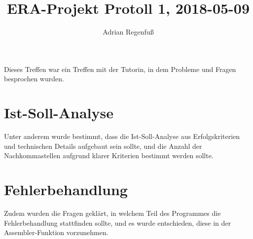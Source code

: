 \documentclass{article}
\title{ERA-Projekt Protoll 1, 2018-05-09}
\author{Adrian Regenfuß}
\begin{document}
\maketitle

Dieses Treffen war ein Treffen mit der Tutorin, in dem Probleme und
Fragen besprochen wurden.

\section{Ist-Soll-Analyse}

Unter anderem wurde bestimmt, dass die Ist-Soll-Analyse aus
Erfolgskriterien und technischen Details aufgebaut sein sollte, und
die Anzahl der Nachkommastellen aufgrund klarer Kriterien bestimmt
werden sollte.

\section{Fehlerbehandlung}

Zudem wurden die Fragen geklärt, in welchem Teil des Programmes die
Fehlerbehandlung stattfinden sollte, und es wurde entschieden, diese in
der Assembler-Funktion vorzunehmen.
\end{document}
